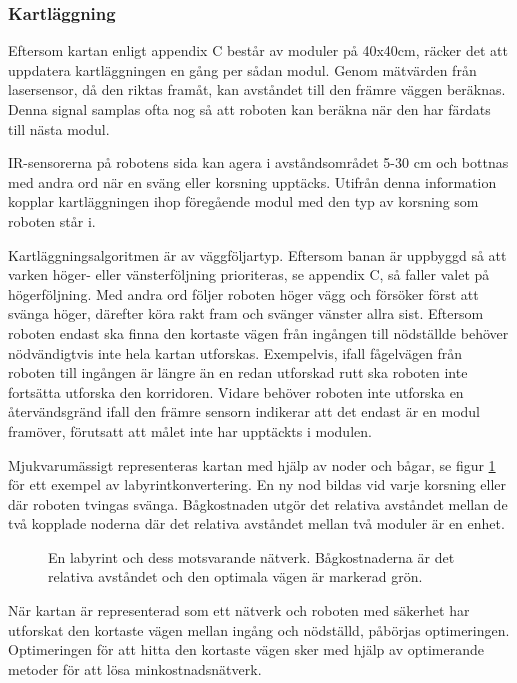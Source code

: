 \documentclass[11pt]{article}
\begin{document}
\begin{flushleft}
\subsubsection{Kartläggning}
Eftersom kartan enligt appendix C består av moduler på 40x40cm, räcker det att uppdatera kartläggningen en gång per sådan modul. Genom mätvärden från lasersensor, då den riktas framåt, kan avståndet till den främre väggen beräknas. Denna signal samplas ofta nog så att roboten kan beräkna när den har färdats till nästa modul. 

IR-sensorerna på robotens sida kan agera i avståndsområdet 5-30 cm och bottnas med andra ord när en sväng eller korsning upptäcks. Utifrån denna information kopplar kartläggningen ihop föregående modul med den typ av korsning som roboten står i. 

Kartläggningsalgoritmen är av väggföljartyp. Eftersom banan är uppbyggd så att varken höger- eller vänsterföljning prioriteras, se appendix C, så faller valet på högerföljning. Med andra ord följer roboten höger vägg och försöker först att svänga höger, därefter köra rakt fram och svänger vänster allra sist. Eftersom roboten endast ska finna den kortaste vägen från ingången till nödställde behöver nödvändigtvis inte hela kartan utforskas. Exempelvis, ifall fågelvägen från roboten till ingången är längre än en redan utforskad rutt ska roboten inte fortsätta utforska den korridoren. Vidare behöver roboten inte utforska en återvändsgränd ifall den främre sensorn indikerar att det endast är en modul framöver, förutsatt att målet inte har upptäckts i modulen.

Mjukvarumässigt representeras kartan med hjälp av noder och bågar, se figur \ref{labToGraph} för ett exempel av labyrintkonvertering. En ny nod bildas vid varje korsning eller där roboten tvingas svänga. Bågkostnaden utgör det relativa avståndet mellan de två kopplade noderna där det relativa avståndet mellan två moduler är en enhet.

\begin{figure}[htbp]
\centering
\noindent\resizebox{.6\linewidth}{!}{
	}
	\caption{En labyrint och dess motsvarande nätverk. Bågkostnaderna är det relativa avståndet och den optimala vägen är markerad grön.\label{labToGraph}}	
\end{figure}

När kartan är representerad som ett nätverk och roboten med säkerhet har utforskat den kortaste vägen mellan ingång och nödställd, påbörjas optimeringen. Optimeringen för att hitta den kortaste vägen sker med hjälp av optimerande metoder för att lösa minkostnadsnätverk.


\end{flushleft}
\end{document}
